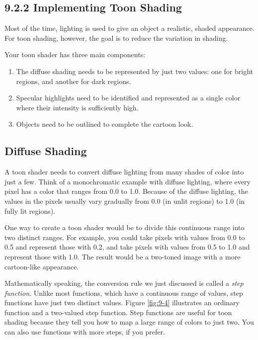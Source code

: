 \documentclass[../main.tex]{subfiles}
\begin{document}
\subsection{9.2.2 Implementing Toon Shading}

Most of the time, lighting is used to give an object a realistic, shaded appearance. For toon shading, however, the goal is to reduce the variation in shading.

Your toon shader has three main components:

\begin{enumerate}
\item The diffuse shading needs to be represented by just two values: one for bright regions, and another for dark regions.
\item Specular highlights need to be identified and represented as a single color where their intensity is sufficiently high.
\item Objects need to be outlined to complete the cartoon look.
\end{enumerate}

\subsection{Diffuse Shading}

A toon shader needs to convert diffuse lighting from many shades of color into just a few. Think of a monochromatic example with diffuse lighting, where every pixel has a color that ranges from 0.0 to 1.0. Because of the diffuse lighting, the values in the pixels usually vary gradually from 0.0 (in unlit regions) to 1.0 (in fully lit regions).

One way to create a toon shader would be to divide this continuous range into two distinct ranges. For example, you could take pixels with values from 0.0 to 0.5 and represent those with 0.2, and take pixels with values from 0.5 to 1.0 and represent those with 1.0. The result would be a two-toned image with a more cartoon-like appearance.

Mathematically speaking, the conversion rule we just discussed is called a \textit{step function}. Unlike most functions, which have a continuous range of values, step functions have just two distinct values. Figure \ref{fig:9-4} illustrates an ordinary function and a two-valued step function. Step functions are useful for toon shading because they tell you how to map a large range of colors to just two. You can also use functions with more steps, if you prefer.
\end{document}

